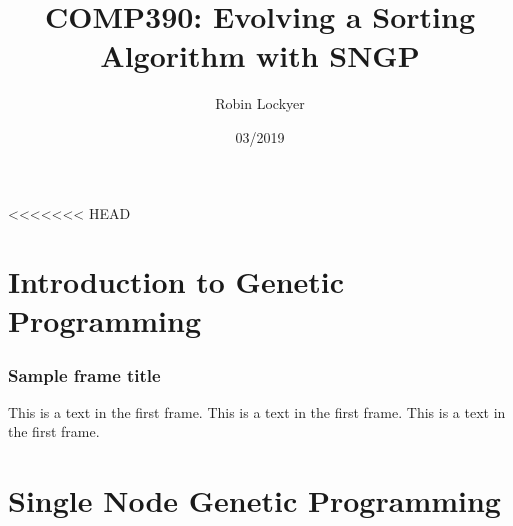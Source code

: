 \documentclass{beamer}
\title{COMP390: Evolving a Sorting Algorithm with SNGP}
\author{Robin Lockyer}
\institute{University of Liverpool}
\date{03/2019}
\begin{document}
	
	\frame{\titlepage}
	
	\frame{\tableofcontents}
	
<<<<<<< HEAD
	\section{Introduction to Genetic Programming}
	
		\begin{frame}
			\frametitle{Sample frame title}
			This is a text in the first frame. This is a text in the first frame. This is a text in the first frame.
		\end{frame}
	
	\section{Single Node Genetic Programming}
	
\end{document}
